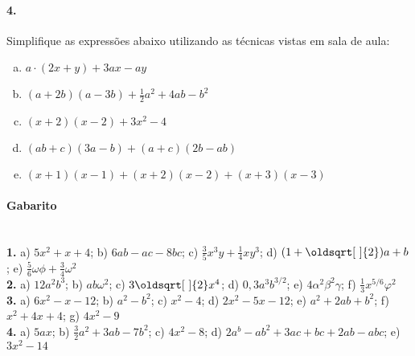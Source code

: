 \documentclass[a4paper,twocolumn,12pt]{article}
\renewcommand*{\sqrt}[2][\ ]{\oldsqrt[#1]{#2}}
\begin{document}
\paragraph*{4.} Simplifique as expressões abaixo utilizando as técnicas vistas em sala de aula:
\begin{enumerate}[a)]
\item $a\cdot(2x + y) + 3ax - ay$
\item $(a+2b)(a-3b) + \frac{1}{2}a^2 +4ab -b^2$
\item $(x+2)(x-2) + 3x^2 - 4$
\item $(ab +c)(3a - b) + (a + c)(2b - ab)$
\item $(x+1)(x-1) + (x+2)(x-2) + (x+3)(x-3)$
\end{enumerate}

\vspace*{\fill}

{\footnotesize \color{darkgray}
\paragraph*{Gabarito} \hspace*{\fill}\\
\textbf{1.} a) $5x^2 + x + 4$; b) $6ab - ac - 8bc$; c) $\frac{3}{5}x^3y + \frac{1}{4}xy^3$; d) $(1 + \sqrt{2})a + b$; e) $\frac{5}{6}\omega\phi +\frac{3}{4}\omega^2 $\\
\textbf{2.} a) $12a^2b^3$; b) $ab\omega^2$; c) $3\sqrt{2}x^4$; d) $0,\!3a^3b^{3/2}$; e) $4\alpha^2\beta^2\gamma$; f) $\frac{1}{3}x^{5/6}\varphi^2$\\
\textbf{3.} a) $6x^2 - x - 12$; b) $a^2 - b^2$; c) $x^2 - 4$; d) $2x^2 - 5x - 12$; e) $a^2 + 2ab + b^2$; f) $x^2 + 4x + 4$; g) $4x^2 - 9$\\
\textbf{4.} a) $5ax $; b) $\frac{3}{2}a^2 +3ab - 7b^2$; c) $4x^2 - 8$; d) $2a^b - ab^2 + 3ac + bc + 2ab - abc$; e) $3x^2 - 14$
}
\end{document}
